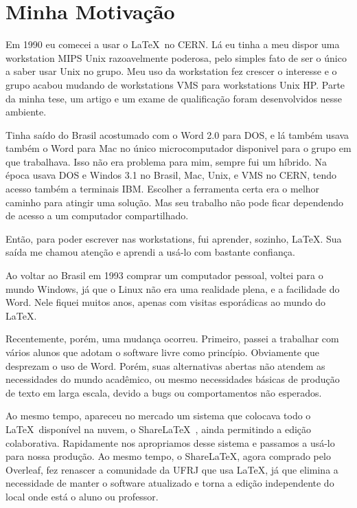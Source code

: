 \documentclass[12pt,a4paper]{book}
\begin{document}
                                                                      
\chapter*{Minha Motivação}

Em 1990 eu comecei a usar o \LaTeX\  no CERN. Lá eu tinha a meu dispor uma workstation MIPS Unix razoavelmente poderosa, pelo simples fato de ser o único a saber usar Unix no grupo. Meu uso da workstation fez crescer o interesse e o grupo acabou mudando de workstations VMS para workstations Unix HP. 
Parte da minha tese, um artigo e um exame de qualificação foram desenvolvidos nesse ambiente.

Tinha saído do Brasil acostumado com o Word 2.0 para DOS, e lá também usava também o Word para Mac no único microcomputador disponivel para o grupo em que trabalhava. Isso não era problema para mim, sempre fui um híbrido. Na época usava DOS e Windos 3.1 no Brasil, Mac, Unix, e VMS no CERN, tendo acesso também a terminais IBM. Escolher a ferramenta certa era o melhor caminho para atingir uma solução. Mas seu trabalho não pode ficar dependendo de acesso a um computador compartilhado.

Então, para poder escrever nas workstations, fui aprender, sozinho, \LaTeX. Sua saída me chamou atenção  e aprendi a usá-lo com bastante confiança.

Ao voltar ao Brasil em 1993 comprar um computador pessoal, voltei para o mundo Windows, já que o Linux não era uma realidade plena, e a facilidade do Word. Nele fiquei muitos anos, apenas com visitas esporádicas ao mundo do \LaTeX.

Recentemente, porém, uma mudança ocorreu. Primeiro, passei a trabalhar com vários alunos que adotam o software livre como princípio. Obviamente que desprezam o uso de Word. Porém, suas alternativas abertas não atendem as necessidades do mundo acadêmico, ou mesmo necessidades básicas de produção de texto em larga escala, devido a bugs ou comportamentos não esperados.

Ao mesmo tempo, apareceu no mercado um sistema que colocava todo o \LaTeX\ disponível na nuvem, o Share\LaTeX\ , ainda permitindo a edição colaborativa. Rapidamente nos apropriamos desse sistema e passamos a usá-lo para nossa produção. Ao mesmo tempo, o Share\LaTeX, agora comprado pelo Overleaf, fez renascer a comunidade da UFRJ que usa \LaTeX, já que elimina a necessidade de manter o software atualizado e torna a edição independente do local onde está o aluno ou professor.
\end{document}

